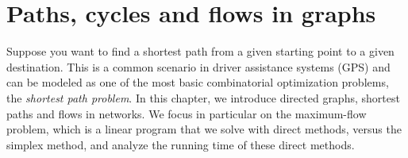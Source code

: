 \chapter{Paths, cycles and flows in graphs} 
\label{cha:short-paths-graphs}


Suppose you want to find a shortest path from a given starting point
to a given destination. This is a common scenario in driver assistance
systems (GPS) and can be modeled as one of the most basic
combinatorial optimization problems, the \emph{shortest path problem}.
In this chapter, we introduce directed graphs, shortest paths and
flows in networks. We focus in particular on the maximum-flow problem,
which is a linear program that we solve with direct methods, versus
the simplex method, and analyze the running time of these direct
methods.




  




